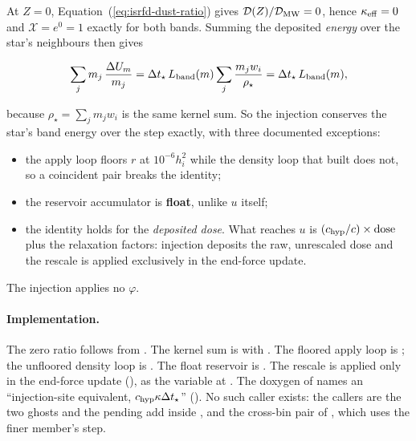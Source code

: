 At $Z = 0$, Equation~(\ref{eq:isrfd-dust-ratio}) gives
$\mathcal{D}(Z)/\mathcal{D}_{\rm MW} = 0$,
hence $\kappa_{\rm eff} = 0$ and
$\mathcal{X} = e^{0} = 1$ exactly for both bands. Summing the deposited
\emph{energy} over the star's neighbours then gives

\begin{equation}
  \sum_j m_j\,\frac{\Delta U_m}{m_j}
  = \Delta t_\star\, L_{\rm band}(m) \sum_j \frac{m_j w_i}{\rho_\star}
  = \Delta t_\star\, L_{\rm band}(m),
  \label{eq:isrfd-inj-identity}
\end{equation}

because $\rho_\star = \sum_j m_j w_i$ is the same kernel sum. So the injection
conserves the star's band energy over the step exactly, with three documented
exceptions:

\begin{itemize}
  \item the apply loop floors $r$ at $10^{-6}h_i^2$
    while the density loop that built
     does not, so a
    coincident pair breaks the identity;
  \item the reservoir accumulator is \textbf{float}, unlike $u$ itself;
  \item the identity holds for the \emph{deposited dose}. What reaches $u$ is
    $(c_{\rm hyp}/c)\times\text{dose}$ plus the relaxation factors:
    injection deposits the raw, unrescaled dose
    and the rescale is applied exclusively in the end-force update.
\end{itemize}

The injection applies no $\varphi$.

\paragraph{Implementation.} The zero ratio follows from
. The kernel sum is 
with . The floored apply loop is
; the unfloored density loop is
. The float reservoir is .
The rescale is applied only in the end-force update
(), as the variable  at
. The doxygen of
 names an ``injection-site equivalent,
$c_{\rm hyp}\kappa\Delta t_\star$'' (). No such
caller exists: the callers are the two ghosts and the pending add inside
, and the cross-bin pair of
, which uses the finer member's step.


